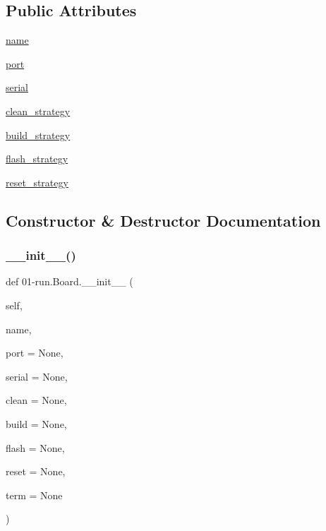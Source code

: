 \subsection*{Public Attributes}
\begin{DoxyCompactItemize}
\item 
\hyperlink{class01-run_1_1Board_a6b12d2aef3623e3f594334510cfd11f9}{name}
\item 
\hyperlink{class01-run_1_1Board_a48c43d64d519839c4f5872e48a59e208}{port}
\item 
\hyperlink{class01-run_1_1Board_a51cd30d7dd75df818803f51e7de5e65d}{serial}
\item 
\hyperlink{class01-run_1_1Board_aa0cad1ed6da4f9a947cdc140ff233a2b}{clean\+\_\+strategy}
\item 
\hyperlink{class01-run_1_1Board_abddc7b3358251be3e8e9bb345bb4137f}{build\+\_\+strategy}
\item 
\hyperlink{class01-run_1_1Board_af3f0614c7607df6bf16f7c24d9d0bcce}{flash\+\_\+strategy}
\item 
\hyperlink{class01-run_1_1Board_a1338e87bc761be6fc419ebb8a88d6114}{reset\+\_\+strategy}
\end{DoxyCompactItemize}


\subsection{Constructor \& Destructor Documentation}
\mbox{\label{class01-run_1_1Board_ad35a808e040817150bcd922b6c0aeeef}} 
\subsubsection{\texorpdfstring{\+\_\+\+\_\+init\+\_\+\+\_\+()}{\_\_init\_\_()}}
{\footnotesize\ttfamily def 01-\/run.\+Board.\+\_\+\+\_\+init\+\_\+\+\_\+ (\begin{DoxyParamCaption}\item[{}]{self,  }\item[{}]{name,  }\item[{}]{port = {\ttfamily None},  }\item[{}]{serial = {\ttfamily None},  }\item[{}]{clean = {\ttfamily None},  }\item[{}]{build = {\ttfamily None},  }\item[{}]{flash = {\ttfamily None},  }\item[{}]{reset = {\ttfamily None},  }\item[{}]{term = {\ttfamily None} }\end{DoxyParamCaption})}



